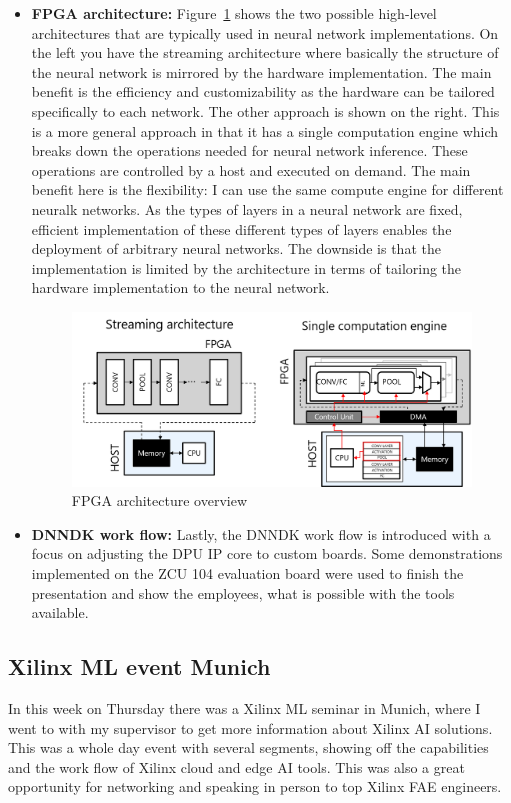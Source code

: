 \begin{itemize}
	\item \textbf{\ac{FPGA} architecture:} Figure~\ref{fig:fpga_arch} shows the two possible high-level architectures that are typically used in neural network implementations. On the left you have the streaming architecture where basically the structure of the neural network is mirrored by the hardware implementation. The main benefit is the efficiency and customizability as the hardware can be tailored specifically to each network. The other approach is shown on the right. This is a more general approach in that it has a single computation engine which breaks down the operations needed for neural network inference. These operations are controlled by a host and executed on demand. The main benefit here is the flexibility: I can use the same compute engine for different neuralk networks. As the types of layers in a neural network are fixed, efficient implementation of these different types of layers enables the deployment of arbitrary neural networks. The downside is that the implementation is limited by the architecture in terms of tailoring the hardware implementation to the neural network.
	\begin{figure}[!htb]
	\centering
		\includegraphics[width=\textwidth]{bilder/FPGA_arch.png}
		\caption{\acs{FPGA} architecture overview}
		\label{fig:fpga_arch}
\end{figure}
	\item \textbf{\ac{DNNDK} work flow:} Lastly, the \ac{DNNDK} work flow is introduced with a focus on adjusting the \ac{DPU} \ac{IP} core to custom boards. Some demonstrations implemented on the ZCU 104 evaluation board were used to finish the presentation and show the employees, what is possible with the tools available.
\end{itemize}
\subsection{Xilinx \acs{ML} event Munich}
In this week on Thursday there was a Xilinx \ac{ML} seminar in Munich, where I went to with my supervisor to get more information about Xilinx \ac{AI} solutions. This was a whole day event with several segments, showing off the capabilities and the work flow of Xilinx cloud and edge \ac{AI} tools. This was also a great opportunity for networking and speaking in person to top Xilinx \ac{FAE} engineers.


